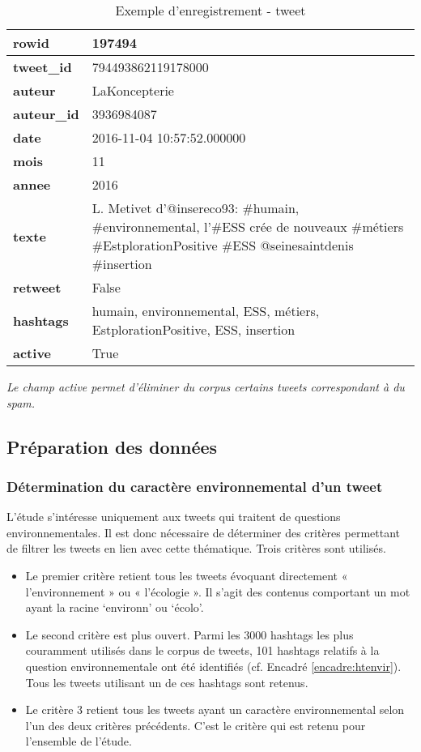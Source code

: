 \begin{table}[h]
    \caption{Exemple d'enregistrement - tweet}
    \label{table:exempleenregistrement}
    \begin{tabularx}{\linewidth}{|l|L|}
    \hline
        \textbf{rowid}& 	197494 \\ \hline
        \textbf{tweet\_id} & 	794493862119178000 \\ \hline
        \textbf{auteur}	& LaKoncepterie \\ \hline
        \textbf{auteur\_id}	& 3936984087 \\ \hline
        \textbf{date}	& 2016-11-04 10:57:52.000000 \\ \hline
        \textbf{mois}	& 11 \\ \hline
        \textbf{annee}	& 2016 \\ \hline
        \textbf{texte}	& L. Metivet d'@insereco93: \#humain, \#environnemental, l'\#ESS crée de nouveaux \#métiers \#EstplorationPositive \#ESS @seinesaintdenis \#insertion \\ \hline
        \textbf{retweet}	& False \\ \hline
        \textbf{hashtags}	& humain, environnemental, ESS, métiers, EstplorationPositive, ESS, insertion \\ \hline
        \textbf{active}	& True \\ \hline
    \end{tabularx}
    \textit{Le champ active permet d’éliminer du corpus certains tweets correspondant à du spam. }
\end{table}

\subsection{Préparation des données}

\subsubsection{Détermination du caractère environnemental d’un tweet}
L’étude s’intéresse uniquement aux tweets qui traitent de questions environnementales. Il est donc nécessaire de déterminer des critères permettant de filtrer les tweets en lien avec cette thématique. Trois critères sont utilisés.
\begin{itemize}
    \item Le premier critère retient tous les tweets évoquant directement « l’environnement » ou « l’écologie ». Il s’agit des contenus comportant un mot ayant la racine ‘environn’ ou ‘écolo’.
    \item Le second critère est plus ouvert. Parmi les 3000 hashtags les plus couramment utilisés dans le corpus de tweets, 101 hashtags relatifs à la question environnementale ont été identifiés (cf. Encadré \ref{encadre:htenvir}). Tous les tweets utilisant un de ces hashtags sont retenus.
    \item Le critère 3 retient tous les tweets ayant un caractère environnemental selon l’un des deux critères précédents. C’est le critère qui est retenu pour l’ensemble de l’étude.
\end{itemize}

